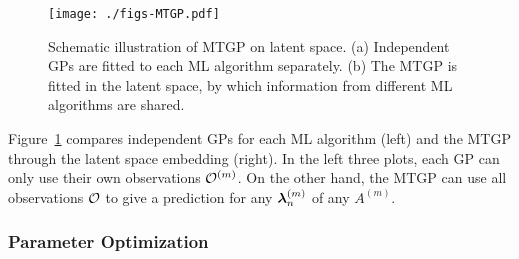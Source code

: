 \begin{figure}[t]
 \centering
 \texttt{[image: ./figs-MTGP.pdf]}
 \caption{
 Schematic illustration of MTGP on latent space. 
 (a) Independent GPs are fitted to each ML algorithm separately. 
 (b) The MTGP is fitted in the latent space, by which information from different ML algorithms are shared.
 }
  \label{fig:proposed}
\end{figure}

Figure~\ref{fig:proposed} compares independent GPs for each ML algorithm (left) and the MTGP through the latent space embedding (right).
%
In the left three plots, each GP can only use their own observations ${\mathcal O}^{(m)}$.
%
On the other hand, the MTGP can use all observations ${\mathcal O}$ to give a prediction for any $\boldsymbol{\lambda}_n^{(m)}$ of any $A^{(m)}$.



\subsubsection{Parameter Optimization}
\label{sssec:parameter-optimization}


